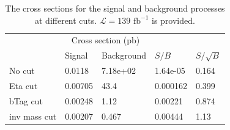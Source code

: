 \documentclass[12pt]{article}
\begin{document}
	\begin{table}[htpb]
		\centering
		\caption{The cross sections for the signal and background processes at different cuts. $\mathcal{L} = 139 \text{ fb}^{-1}$ is provided.}
		\label{tab:signal_background_analysis}
		\begin{tabular}{l|ll|ll}
						 & \multicolumn{2}{|c|}{Cross section (pb)} &            &             \\
						 & Signal          & Background      & $S / B$        & $S / \sqrt{B}$ \\
			\hline 	
			No cut       & 0.0118         & 7.18e+02         & 1.64e-05 & 0.164       \\
			Eta cut      & 0.00705        & 43.4             & 0.000162 & 0.399       \\
			bTag cut     & 0.00248        & 1.12             & 0.00221  & 0.874       \\
			inv mass cut & 0.00207        & 0.467            & 0.00444  & 1.13       
			\end{tabular}
	\end{table}


\end{document}
